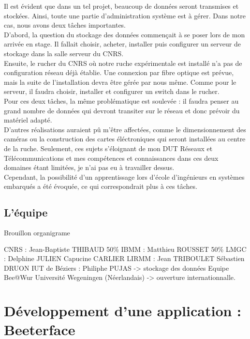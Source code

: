 \documentclass[11pt,french,a4paper]{report}
\begin{document}
Il est évident que dans un tel projet, beaucoup de données seront transmises et stockées. Ainsi, toute une partie d'administration 
système est à gérer. Dans notre cas, nous avons deux tâches importantes.\\
D'abord, la question du stockage des données commençait à se poser lors de mon arrivée en stage. Il fallait choisir, acheter, installer
puis configurer un serveur de stockage dans la salle serveur du CNRS.\\
Ensuite, le rucher du CNRS où notre ruche expérimentale est installé n'a pas de configuration réseau déjà établie. 
Une connexion par fibre optique est prévue, mais la suite de l'installation devra être gérée par nous même. Comme pour le serveur, 
il faudra choisir, installer et configurer un switch dans le rucher.\\
Pour ces deux tâches, la même problématique est soulevée : il faudra penser au grand nombre de données qui devront transiter sur le 
réseau et donc prévoir du matériel adapté.\\
D'autres réalisations auraient pû m'être affectées, comme le dimensionnement des caméras ou la construction des cartes éléctroniques
qui seront installées au centre de la ruche. Seulement, ces sujets s'éloignant de mon DUT Réseaux et Télécommunications et mes 
compétences et connaissances dans ces deux domaines étant limitées, je n'ai pas eu à travailler dessus.\\
Cependant, la possibilité d'un apprentissage lors d'école d'ingénieurs en systèmes embarqués a été évoquée, ce qui correspondrait 
plus à ces tâches.\\


\section{L'équipe}

Brouillon organigrame 

CNRS : Jean-Baptiste THIBAUD 50\%
IBMM : Matthieu ROUSSET 50\%
LMGC : Delphine JULIEN
       Capucine CARLIER
LIRMM : Jean TRIBOULET 
        Sébastien DRUON 
IUT de Béziers : Philiphe PUJAS -> stockage des données 
Equipe Bee@Wur Université Wegeningen (Néerlandais) -> ouverture internationnalle. 


\chapter{Développement d'une application : Beeterface}
\end{document}
